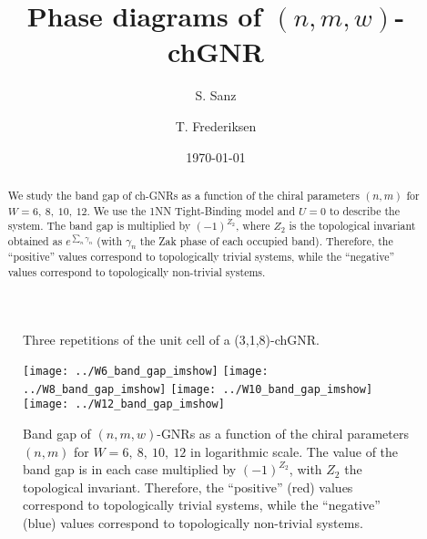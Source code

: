 \documentclass[amsmath,%
amssymb,prb,superscriptaddress]{revtex4}
\begin{document}
\title{Phase diagrams of $(n,m,w)$-chGNR}

\author{S. Sanz}

\author{T. Frederiksen}

\date{\today}

\begin{abstract}
We study the band gap of ch-GNRs as a function of the chiral parameters $(n,m)$ for $W=6, \ 8, \ 10, \ 12$. We use the 1NN Tight-Binding model and $U=0$ to describe the system. The band gap is multiplied by $(-1)^{Z_{2}}$, where $Z_{2}$ is the topological invariant obtained as $e^{\sum_{n}\gamma_{n}}$ (with $\gamma_{n}$ the Zak phase of each occupied band). Therefore, the ``positive'' values correspond to topologically trivial systems, while the ``negative'' values correspond to topologically non-trivial systems.%
\end{abstract}


\maketitle

\begin{figure*}
	\scalebox{2.8}{}
	\caption{Three repetitions of the unit cell of a (3,1,8)-chGNR.}
\end{figure*}

\begin{figure*}
	\texttt{[image: ../W6\_band\_gap\_imshow]}
	\texttt{[image: ../W8\_band\_gap\_imshow]}
	\texttt{[image: ../W10\_band\_gap\_imshow]}
	\texttt{[image: ../W12\_band\_gap\_imshow]}
	\caption{Band gap of $(n,m,w)$-GNRs as a function of the chiral parameters $(n,m)$ for $W=6, \ 8, \ 10, \ 12$ in logarithmic scale. The value of the band gap is in each case multiplied by $(-1)^{Z_{2}}$, with $Z_{2}$ the topological invariant. Therefore, the ``positive'' (red) values correspond to topologically trivial systems, while the ``negative'' (blue) values correspond to topologically non-trivial systems.}
\end{figure*}
\end{document}

